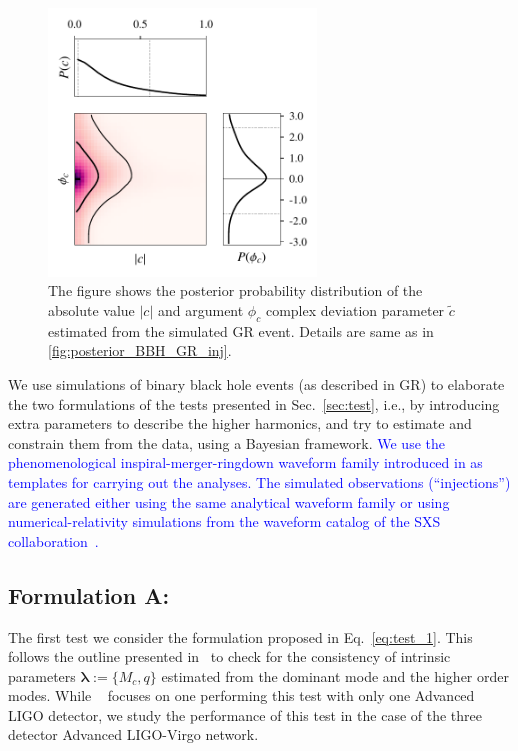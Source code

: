 \documentclass[prd,preprintnumbers,twocolumn,eqsecnum,floatfix,a4paper,nofootinbib,superscriptaddress]{revtex4}
\newcommand{\blue}[1]{\textcolor{blue}{#1}}
\newcommand{\blambda}{\bm{\lambda}}
\begin{document}
\begin{figure}[tbh]
	\begin{center}
		\includegraphics[width=2.8in]{figs/M_80_q_9_SNR_25_complex_c1.pdf}
	\end{center} 
	\caption{The figure shows the posterior probability distribution of the absolute value $|c|$ and argument $\phi_c$ complex deviation parameter $\tilde{c}$ estimated from the simulated GR event. Details are same as in \ref{fig:posterior_BBH_GR_inj}.}
	\label{fig:c1_complex}
\end{figure}

We use simulations of binary black hole events (as described in GR) to elaborate the two formulations of the tests presented in Sec.~\ref{sec:test}, i.e., by introducing extra parameters to describe the higher harmonics, and try to estimate and constrain them from the data, using a Bayesian framework. \blue{We use the phenomenological inspiral-merger-ringdown waveform family introduced in \cite{Mehta:2017jpq} as templates for carrying out the analyses. The simulated observations (``injections'') are generated either using the same analytical waveform family or using numerical-relativity simulations from the waveform catalog of the SXS collaboration~\cite{SXS-Catalog}.} 


\subsection{Formulation A:}
\label{sec:formulationA}
The first test we consider the formulation proposed in Eq.~\eqref{eq:test_1}. This follows the outline presented in~\cite{Dhanpal:2018ufk} to check for the consistency of intrinsic parameters $\blambda := \{M_c, q\}$ estimated from the dominant mode and the higher order modes. While ~\cite{Dhanpal:2018ufk} focuses on one performing this test with only one Advanced LIGO detector, we study the performance of this test in the case of the three detector Advanced LIGO-Virgo network. 
\end{document}
